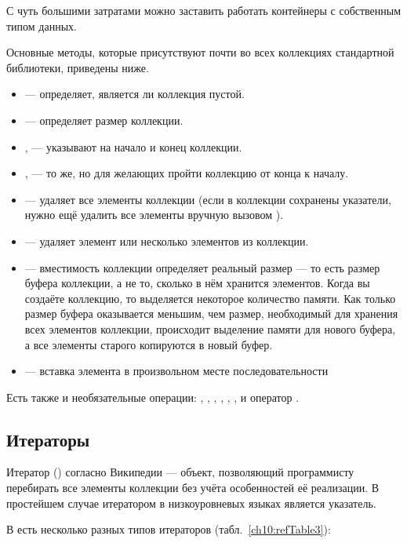
С чуть большими затратами можно заставить работать контейнеры с собственным типом данных.

Основные методы, которые присутствуют почти во всех коллекциях стандартной библиотеки, приведены ниже.

\begin{itemize}
\item {} --- определяет, является ли коллекция пустой.
\item {} --- определяет размер коллекции.
\item {},  --- указывают на начало и конец коллекции.
\item {},  --- то же, но для желающих пройти коллекцию от конца к
началу.
\item {} --- удаляет все элементы коллекции (если в коллекции сохранены указатели, нужно ещё
удалить все элементы вручную вызовом ).
\item {} --- удаляет элемент или несколько элементов из коллекции.
\item {} --- вместимость коллекции определяет реальный размер --- то есть размер буфера
коллекции, а не то, сколько в нём хранится элементов. Когда вы создаёте коллекцию, то выделяется некоторое количество
памяти. Как только размер буфера оказывается меньшим, чем размер, необходимый для хранения всех элементов коллекции,
происходит выделение памяти для нового буфера, а все элементы старого копируются в новый буфер.
\item {} --- вставка элемента в произвольном месте последовательности
\end{itemize}
Есть также и необязательные операции: , ,
, , ,
, и оператор \Sys{[]}.

\subsection[Итераторы]{Итераторы}
Итератор () согласно Википедии --- объект, позволяющий программисту перебирать все элементы
коллекции без учёта особенностей её реализации. В простейшем случае итератором в низкоуровневых языках является
указатель.

В  есть несколько разных типов итераторов (табл.~\ref{ch10:refTable3}):

